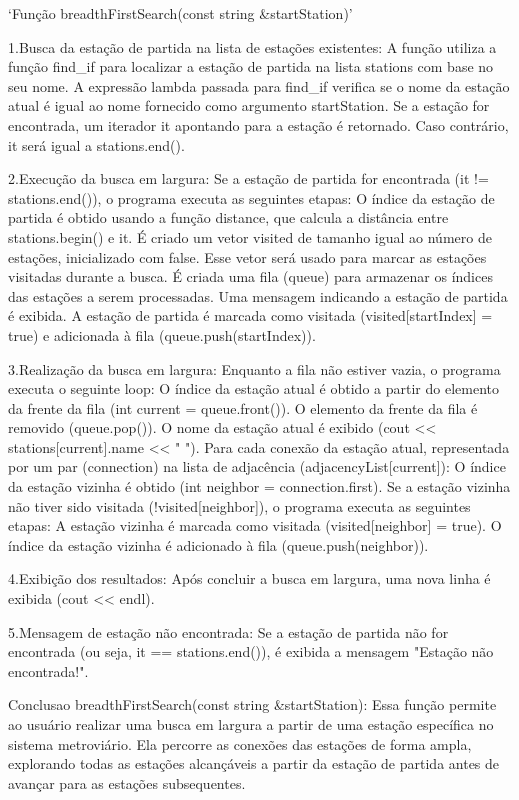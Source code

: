 `Função breadthFirstSearch(const string &startStation)'

1.Busca da estação de partida na lista de estações existentes:
A função utiliza a função find_if para localizar a estação de partida na lista stations com base no seu nome. A expressão lambda passada para find_if verifica se o nome da estação atual é igual ao nome fornecido como argumento startStation.
Se a estação for encontrada, um iterador it apontando para a estação é retornado. Caso contrário, it será igual a stations.end().

2.Execução da busca em largura:
Se a estação de partida for encontrada (it != stations.end()), o programa executa as seguintes etapas:
O índice da estação de partida é obtido usando a função distance, que calcula a distância entre stations.begin() e it.
É criado um vetor visited de tamanho igual ao número de estações, inicializado com false. Esse vetor será usado para marcar as estações visitadas durante a busca.
É criada uma fila (queue) para armazenar os índices das estações a serem processadas.
Uma mensagem indicando a estação de partida é exibida.
A estação de partida é marcada como visitada (visited[startIndex] = true) e adicionada à fila (queue.push(startIndex)).

3.Realização da busca em largura:
Enquanto a fila não estiver vazia, o programa executa o seguinte loop:
O índice da estação atual é obtido a partir do elemento da frente da fila (int current = queue.front()).
O elemento da frente da fila é removido (queue.pop()).
O nome da estação atual é exibido (cout << stations[current].name << " ").
Para cada conexão da estação atual, representada por um par (connection) na lista de adjacência (adjacencyList[current]):
O índice da estação vizinha é obtido (int neighbor = connection.first).
Se a estação vizinha não tiver sido visitada (!visited[neighbor]), o programa executa as seguintes etapas:
A estação vizinha é marcada como visitada (visited[neighbor] = true).
O índice da estação vizinha é adicionado à fila (queue.push(neighbor)).

4.Exibição dos resultados:
Após concluir a busca em largura, uma nova linha é exibida (cout << endl).

5.Mensagem de estação não encontrada:
Se a estação de partida não for encontrada (ou seja, it == stations.end()), é exibida a mensagem "Estação não encontrada!".

Conclusao breadthFirstSearch(const string &startStation):
Essa função permite ao usuário realizar uma busca em largura a partir de uma estação específica no sistema metroviário.
Ela percorre as conexões das estações de forma ampla, explorando todas as estações alcançáveis a partir da estação de partida antes de avançar para as estações subsequentes.

